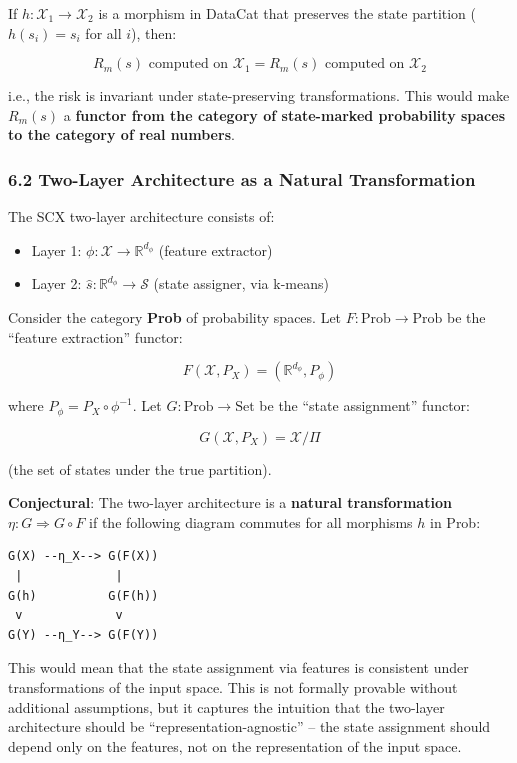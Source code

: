 \documentclass[
  12pt,
]{ctexart}
\providecommand{\tightlist}{%
  \setlength{\itemsep}{0pt}\setlength{\parskip}{0pt}}
\begin{document}
If \(h: \mathcal{X}_1 \to \mathcal{X}_2\) is a morphism in DataCat that
preserves the state partition (\(h(s_i) = s_i\) for all \(i\)), then:

\[R_m(s) \text{ computed on } \mathcal{X}_1 = R_m(s) \text{ computed on } \mathcal{X}_2\]

i.e., the risk is invariant under state-preserving transformations. This
would make \(R_m(s)\) a \textbf{functor from the category of
state-marked probability spaces to the category of real numbers}.

\subsubsection{6.2 Two-Layer Architecture as a Natural
Transformation}\label{two-layer-architecture-as-a-natural-transformation}

The SCX two-layer architecture consists of:

\begin{itemize}
\tightlist
\item
  Layer 1: \(\phi: \mathcal{X} \to \mathbb{R}^{d_\phi}\) (feature
  extractor)
\item
  Layer 2: \(\hat{s}: \mathbb{R}^{d_\phi} \to \mathcal{S}\) (state
  assigner, via k-means)
\end{itemize}

Consider the category \textbf{Prob} of probability spaces. Let
\(F: \text{Prob} \to \text{Prob}\) be the ``feature extraction''
functor:

\[F(\mathcal{X}, P_X) = (\mathbb{R}^{d_\phi}, P_\phi)\]

where \(P_\phi = P_X \circ \phi^{-1}\). Let
\(G: \text{Prob} \to \text{Set}\) be the ``state assignment'' functor:

\[G(\mathcal{X}, P_X) = \mathcal{X}/\Pi\]

(the set of states under the true partition).

\textbf{Conjectural}: The two-layer architecture is a \textbf{natural
transformation} \(\eta: G \Rightarrow G \circ F\) if the following
diagram commutes for all morphisms \(h\) in Prob:

\begin{verbatim}
G(X) --η_X--> G(F(X))
 |             |
G(h)          G(F(h))
 v             v
G(Y) --η_Y--> G(F(Y))
\end{verbatim}

This would mean that the state assignment via features is consistent
under transformations of the input space. This is not formally provable
without additional assumptions, but it captures the intuition that the
two-layer architecture should be ``representation-agnostic'' -- the
state assignment should depend only on the features, not on the
representation of the input space.
\end{document}
